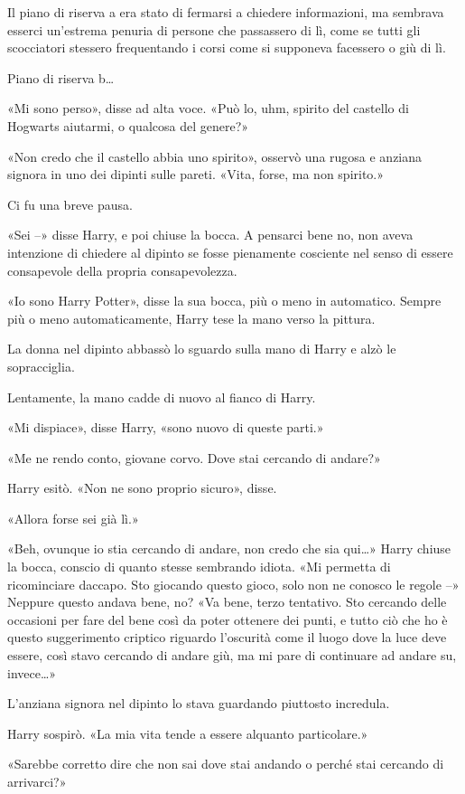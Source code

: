 Il piano di riserva a era stato di fermarsi a chiedere informazioni, ma sembrava esserci un’estrema penuria di persone che passassero di lì, come se tutti gli scocciatori stessero frequentando i corsi come si supponeva facessero o giù di lì.

Piano di riserva b…

«Mi sono perso», disse ad alta voce. «Può lo, uhm, spirito del castello di Hogwarts aiutarmi, o qualcosa del genere?»

«Non credo che il castello abbia uno spirito», osservò una rugosa e anziana signora in uno dei dipinti sulle pareti. «Vita, forse, ma non spirito.»

Ci fu una breve pausa.

«Sei –» disse Harry, e poi chiuse la bocca. A pensarci bene no, non aveva intenzione di chiedere al dipinto se fosse pienamente cosciente nel senso di essere consapevole della propria consapevolezza.

«Io sono Harry Potter», disse la sua bocca, più o meno in automatico. Sempre più o meno automaticamente, Harry tese la mano verso la pittura.

La donna nel dipinto abbassò lo sguardo sulla mano di Harry e alzò le sopracciglia.

Lentamente, la mano cadde di nuovo al fianco di Harry.

«Mi dispiace», disse Harry, «sono nuovo di queste parti.»

«Me ne rendo conto, giovane corvo. Dove stai cercando di andare?»

Harry esitò. «Non ne sono proprio sicuro», disse.

«Allora forse sei già lì.»

«Beh, ovunque io stia cercando di andare, non credo che sia qui…» Harry chiuse la bocca, conscio di quanto stesse sembrando idiota. «Mi permetta di ricominciare daccapo. Sto giocando questo gioco, solo non ne conosco le regole –» Neppure questo andava bene, no? «Va bene, terzo tentativo. Sto cercando delle occasioni per fare del bene così da poter ottenere dei punti, e tutto ciò che ho è questo suggerimento criptico riguardo l’oscurità come il luogo dove la luce deve essere, così stavo cercando di andare giù, ma mi pare di continuare ad andare su, invece…»

L’anziana signora nel dipinto lo stava guardando piuttosto incredula.

Harry sospirò. «La mia vita tende a essere alquanto particolare.»

«Sarebbe corretto dire che non sai dove stai andando o perché stai cercando di arrivarci?»


